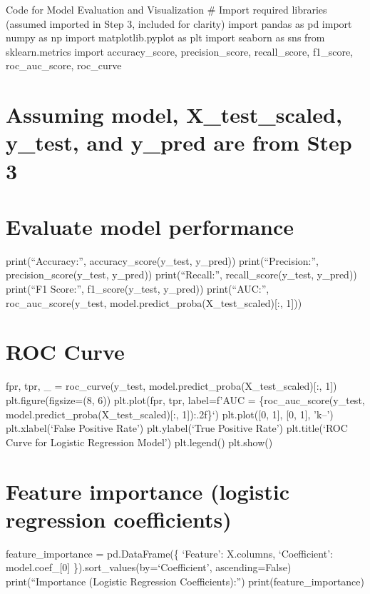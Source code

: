 \documentclass[11pt]{article}
\begin{document}
Code for Model Evaluation and Visualization \# Import required libraries
(assumed imported in Step 3, included for clarity) import pandas as pd
import numpy as np import matplotlib.pyplot as plt import seaborn as sns
from sklearn.metrics import accuracy\_score, precision\_score,
recall\_score, f1\_score, roc\_auc\_score, roc\_curve

\hypertarget{assuming-model-x_test_scaled-y_test-and-y_pred-are-from-step-3}{%
\section{Assuming model, X\_test\_scaled, y\_test, and y\_pred are from
Step
3}\label{assuming-model-x_test_scaled-y_test-and-y_pred-are-from-step-3}}

\hypertarget{evaluate-model-performance}{%
\section{Evaluate model performance}\label{evaluate-model-performance}}

print(``Accuracy:'', accuracy\_score(y\_test, y\_pred))
print(``Precision:'', precision\_score(y\_test, y\_pred))
print(``Recall:'', recall\_score(y\_test, y\_pred)) print(``F1 Score:'',
f1\_score(y\_test, y\_pred)) print(``AUC:'', roc\_auc\_score(y\_test,
model.predict\_proba(X\_test\_scaled){[}:, 1{]}))

\hypertarget{roc-curve}{%
\section{ROC Curve}\label{roc-curve}}

fpr, tpr, \_ = roc\_curve(y\_test,
model.predict\_proba(X\_test\_scaled){[}:, 1{]}) plt.figure(figsize=(8,
6)) plt.plot(fpr, tpr, label=f'AUC = \{roc\_auc\_score(y\_test,
model.predict\_proba(X\_test\_scaled){[}:, 1{]}):.2f\}`) plt.plot({[}0,
1{]}, {[}0, 1{]}, 'k--') plt.xlabel(`False Positive Rate')
plt.ylabel(`True Positive Rate') plt.title(`ROC Curve for Logistic
Regression Model') plt.legend() plt.show()

\hypertarget{feature-importance-logistic-regression-coefficients}{%
\section{Feature importance (logistic regression
coefficients)}\label{feature-importance-logistic-regression-coefficients}}

feature\_importance = pd.DataFrame(\{ `Feature': X.columns,
`Coefficient': model.coef\_{[}0{]} \}).sort\_values(by=`Coefficient',
ascending=False) print(``\nFeature Importance (Logistic Regression
Coefficients):'') print(feature\_importance)
\end{document}
